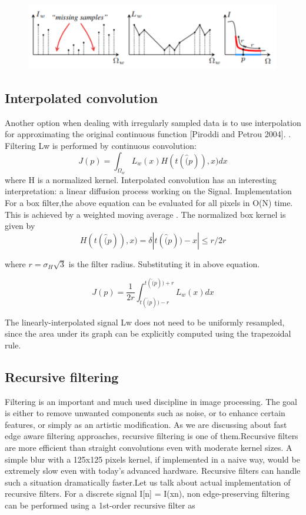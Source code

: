 \documentclass[conference]{IEEEtran}
\begin{document}
 \begin{figure}
 	\includegraphics[width = \linewidth]{NC_sample.png}
 	\label{fig:NC_sample}
 \end{figure}
 
 
 
 \subsection{Interpolated convolution}
  Another option when dealing with irregularly sampled data is to use interpolation for approximating the original continuous function
[Piroddi and Petrou 2004]. . Filtering Lw is performed by continuous convolution:
$$J(p) = \int_{\Omega_w}L_w(x)H(t(\hat(p)),x) dx$$
where H is a normalized kernel. Interpolated convolution has an
interesting interpretation: a linear diffusion process working on the
Signal. Implementation For a box filter,the above equation can be evaluated
for all pixels in O(N) time. This is achieved by a weighted moving average
. The normalized box kernel is given by
$$H(t(\hat(p)),x) = \delta{|t(\hat(p))-x| \leq r}/2r$$

where $r = \sigma_H \sqrt{3}$ is the filter radius. Substituting it in above equation.

$$ J(p) = \frac{1}{2r}\int_{t(\hat(p))-r}^{t(\hat(p))+r} L_w(x) dx $$

The linearly-interpolated signal Lw does not need to be uniformly
resampled, since the area under its graph can be explicitly computed
using the trapezoidal rule.


  \subsection{Recursive filtering}
  	Filtering is an important and much used discipline in image processing. The goal is either to remove unwanted components such as noise, or to enhance certain features, or simply as an artistic modification. As we are discussing about fast edge aware filtering approaches, recursive filtering is one of them.Recursive filters are more efficient than straight convolutions even with moderate kernel sizes. A simple blur with a 125x125 pixels kernel, if implemented in a naive way, would be extremely slow even with today's advanced hardware. Recursive filters can handle such a situation dramatically faster.Let us talk about actual implementation of recursive filters.
For a discrete signal I[n] = I(xn),  non edge-preserving filtering can be performed using a 1st-order recursive filter as 
\end{document}
